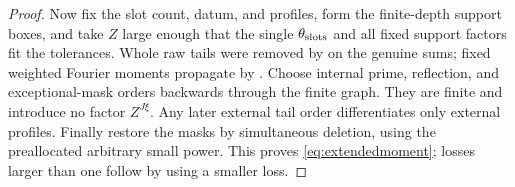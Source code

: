 \begin{proof}
Now fix the slot count, datum, and profiles, form the finite-depth support boxes, and take $Z$ large enough that the single $\theta_{\rm slots}$ and all fixed support factors fit the tolerances. Whole raw tails were removed by  on the genuine sums; fixed weighted Fourier moments propagate by . Choose internal prime, reflection, and exceptional-mask orders backwards through the finite graph. They are finite and introduce no factor $Z^{J\xi}$. Any later external tail order differentiates only external profiles. Finally restore the masks by simultaneous deletion, using the preallocated arbitrary small power. This proves \eqref{eq:extendedmoment}; losses larger than one follow by using a smaller loss.
\end{proof}
